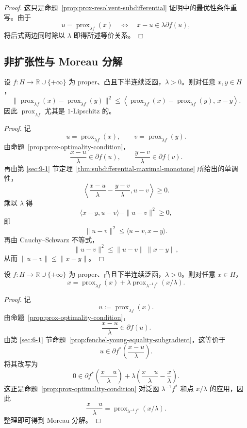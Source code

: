 \begin{proof}
这只是命题~\ref{prop:prox-resolvent-subdifferential} 证明中的最优性条件重写。由于
\[
u=\operatorname{prox}_{\lambda f}(x)
\quad\Longleftrightarrow\quad
x-u\in \lambda \partial f(u),
\]
将后式两边同时除以 $\lambda$ 即得所述等价关系。
\end{proof}

\subsection{非扩张性与 Moreau 分解}

\begin{proposition}\label{prop:prox-firm-nonexpansive}
设 $f\colon H\to \mathbb R\cup\{+\infty\}$ 为 proper、凸且下半连续泛函，$\lambda>0$。则对任意 $x,y\in H$，
\[
\|\operatorname{prox}_{\lambda f}(x)-\operatorname{prox}_{\lambda f}(y)\|^2
\le
\left\langle
\operatorname{prox}_{\lambda f}(x)-\operatorname{prox}_{\lambda f}(y),\,
x-y
\right\rangle.
\]
因此 $\operatorname{prox}_{\lambda f}$ 尤其是 $1$-Lipschitz 的。
\end{proposition}

\begin{proof}
记
\[
u=\operatorname{prox}_{\lambda f}(x),
\qquad
v=\operatorname{prox}_{\lambda f}(y).
\]
由命题~\ref{prop:prox-optimality-condition}，
\[
\frac{x-u}{\lambda}\in \partial f(u),
\qquad
\frac{y-v}{\lambda}\in \partial f(v).
\]
再由第 \ref{sec:9-1} 节定理~\ref{thm:subdifferential-maximal-monotone} 所给出的单调性，
\[
\left\langle
\frac{x-u}{\lambda}-\frac{y-v}{\lambda},
u-v
\right\rangle\ge 0.
\]
乘以 $\lambda$ 得
\[
\langle x-y,u-v\rangle-\|u-v\|^2\ge 0,
\]
即
\[
\|u-v\|^2\le \langle u-v,x-y\rangle.
\]
再由 Cauchy--Schwarz 不等式，
\[
\|u-v\|^2\le \|u-v\|\,\|x-y\|,
\]
从而 $\|u-v\|\le \|x-y\|$。
\end{proof}

\begin{proposition}[Moreau 分解]\label{prop:moreau-decomposition-prox}
设 $f\colon H\to \mathbb R\cup\{+\infty\}$ 为 proper、凸且下半连续泛函，$\lambda>0$。则对任意 $x\in H$，
\[
x
=
\operatorname{prox}_{\lambda f}(x)
+\lambda\operatorname{prox}_{\lambda^{-1}f^\ast}(x/\lambda).
\]
\end{proposition}

\begin{proof}
记
\[
u:=\operatorname{prox}_{\lambda f}(x).
\]
由命题~\ref{prop:prox-optimality-condition}，
\[
\frac{x-u}{\lambda}\in \partial f(u).
\]
由第 \ref{sec:6-1} 节命题~\ref{prop:fenchel-young-equality-subgradient}，这等价于
\[
u\in \partial f^\ast\!\left(\frac{x-u}{\lambda}\right).
\]
将其改写为
\[
0\in \partial f^\ast\!\left(\frac{x-u}{\lambda}\right)+\lambda\left(\frac{x-u}{\lambda}-\frac{x}{\lambda}\right).
\]
这正是命题~\ref{prop:prox-optimality-condition} 对泛函 $\lambda^{-1}f^\ast$ 和点 $x/\lambda$ 的应用，因此
\[
\frac{x-u}{\lambda}
=
\operatorname{prox}_{\lambda^{-1}f^\ast}(x/\lambda).
\]
整理即可得到 Moreau 分解。
\end{proof}

